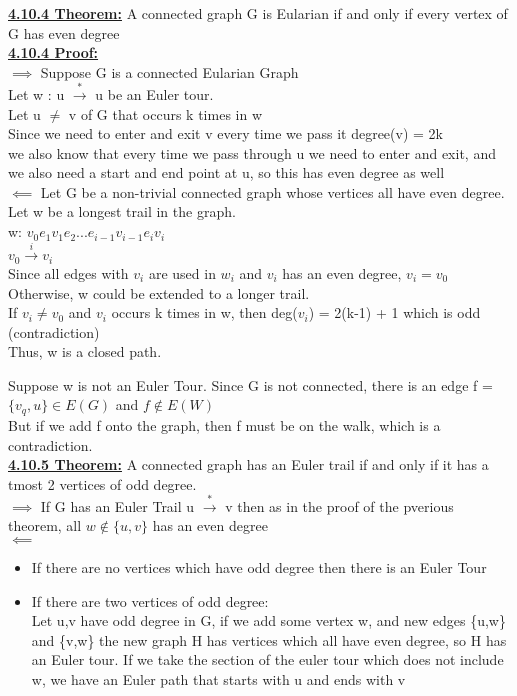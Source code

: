 \documentclass[12pt]{article}
\newcommand{\myt}[1]{\textbf{\underline{#1}}}
\begin{document}
	\myt{4.10.4 Theorem:} A connected graph G is Eularian if and only if every vertex of G has even degree\\
	\myt{4.10.4 Proof:}\\
	$\implies$ Suppose G is a connected Eularian Graph\\
	Let w : u $\overset{*}{\rightarrow}$ u be an Euler tour.\\
	Let u $\neq$ v of G that occurs k times in w\\
	Since we need to enter and exit v every time we pass it degree(v) = 2k\\
	we also know that every time we pass through u we need to enter and exit, and we also need a start and end point at u, so this has even degree as well\\
	
	$\impliedby$ Let G be a non-trivial connected graph whose vertices all have even degree.\\
	
	Let w be a longest trail in the graph.\\
	w: $v_0e_1v_1e_2 ... e_{i-1}v_{i-1}e_iv_i$\\
	$v_0 \overset{i}{\rightarrow} v_i$\\
	
	Since all edges with $v_i$ are used in $w_i$ and $v_i$ has an even degree, $v_i = v_0$\\
	Otherwise, w could be extended to a longer trail.\\
	If $v_i \neq v_0$ and $v_i$ occurs k times in w, then deg($v_i$) = 2(k-1) + 1 which is odd (contradiction)\\
	Thus, w is a closed path.
	
	Suppose w is not an Euler Tour. Since G is not connected, there is an edge f = $\{v_q,u\} \in E(G)$ and $f \notin E(W)$\\
	But if we add f onto the graph, then f must be on the walk, which is a contradiction.\\
	
	\myt{4.10.5 Theorem:} A connected graph has an Euler trail if and only if it has a tmost 2 vertices of odd degree.\\
	
	$\implies$ If G has an Euler Trail u $\overset{*}{\rightarrow}$ v then as in the proof of the pverious theorem, all $w \notin \{u,v\}$ has an even degree\\
	
	$\impliedby$
	\begin{itemize}
		\item If there are no vertices which have odd degree then there is an Euler Tour
		\item If there are two vertices of odd degree:\\
		Let u,v have odd degree in G, if we add some vertex w, and new edges \{u,w\} and \{v,w\} the new graph H has vertices which all have even degree, so H has an Euler tour. If we take the section of the euler tour which does not include w, we have an Euler path that starts with u and ends with v\\
	\end{itemize}
	
\end{document}
